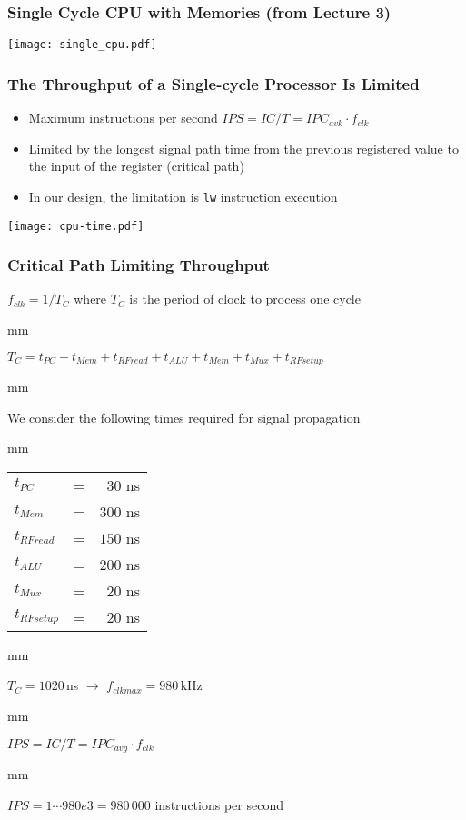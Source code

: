 \documentclass{beamer}
\begin{document}
\begin{frame}
\frametitle{Single Cycle CPU with Memories (from Lecture 3)}
\texttt{[image: single\_cpu.pdf]}
\end{frame}

\begin{frame}
\frametitle{The Throughput of a Single-cycle Processor Is Limited}

\begin{itemize}
 \item Maximum instructions per second $IPS = IC / T = IPC_{avk} \cdot f_{clk}$
 \item Limited by the longest signal path time from the previous registered value to the input of the register (critical path)
 \item In our design, the limitation is \texttt{lw} instruction execution
\end{itemize}

\texttt{[image: cpu-time.pdf]}
\end{frame}

\begin{frame}
\frametitle{Critical Path Limiting Throughput}

$f_{clk} = 1 / T_{C}$ where $T_{C}$ is the period of clock to process one cycle

 mm

$T_{C} = t_{PC} + t_{Mem} + t_{RFread} + t_{ALU} + t_{Mem} + t_{Mux} + t_{RFsetup}$

 mm

We consider the following times required for signal propagation

 mm

\begin{tabular}{l c r}
$t_{PC}$ & = & $30$ ns \\
$t_{Mem}$ & = & $300$ ns \\
$t_{RFread}$ & = & $150$ ns \\
$t_{ALU}$ & = & $200$ ns \\
$t_{Mux}$ & = & $20$ ns \\
$t_{RFsetup}$ & = & $20$ ns \\
\end{tabular}

 mm

$T_{C} = 1020$\,ns $\rightarrow$ $f_{clk max} = 980$\,kHz

 mm

$IPS = IC / T = IPC_{avg} \cdot f_{clk}$

 mm

$IPS = 1 \cdots 980e3 = 980\,000$ instructions per second

\end{frame}
\end{document}
